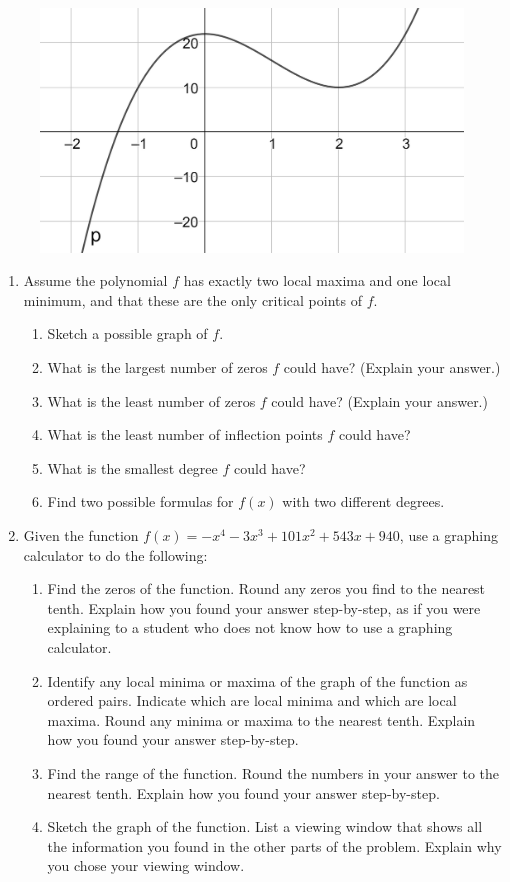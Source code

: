 \documentclass[
]{book}
\providecommand{\tightlist}{%
  \setlength{\itemsep}{0pt}\setlength{\parskip}{0pt}}
\theoremstyle{definition}
\theoremstyle{definition}
\theoremstyle{definition}
\theoremstyle{remark}
\begin{document}
\begin{figure}

{\centering \includegraphics[width=0.3\linewidth]{images/polygraph3} 

}

\end{figure}

\begin{enumerate}
\def\labelenumi{\arabic{enumi}.}
\item
  Assume the polynomial \(f\) has exactly two local maxima and one local minimum, and that these are the only critical points of \(f\).

  \begin{enumerate}
  \def\labelenumii{\alph{enumii}.}
  \tightlist
  \item
    Sketch a possible graph of \(f\).
  \item
    What is the largest number of zeros \(f\) could have? (Explain your answer.)
  \item
    What is the least number of zeros \(f\) could have? (Explain your answer.)
  \item
    What is the least number of inflection points \(f\) could have?
  \item
    What is the smallest degree \(f\) could have?
  \item
    Find two possible formulas for \(f(x)\) with two different degrees.
  \end{enumerate}
\item
  Given the function \(f(x)=-x^4-3x^3+101x^2+543x+940\), use a graphing calculator to do the following:

  \begin{enumerate}
  \def\labelenumii{\alph{enumii}.}
  \tightlist
  \item
    Find the zeros of the function. Round any zeros you find to the nearest tenth. Explain how you found your answer step-by-step, as if you were explaining to a student who does not know how to use a graphing calculator.
  \item
    Identify any local minima or maxima of the graph of the function as ordered pairs. Indicate which are local minima and which are local maxima. Round any minima or maxima to the nearest tenth. Explain how you found your answer step-by-step.
  \item
    Find the range of the function. Round the numbers in your answer to the nearest tenth. Explain how you found your answer step-by-step.
  \item
    Sketch the graph of the function. List a viewing window that shows all the information you found in the other parts of the problem. Explain why you chose your viewing window.
  \end{enumerate}
\end{enumerate}
\end{document}
